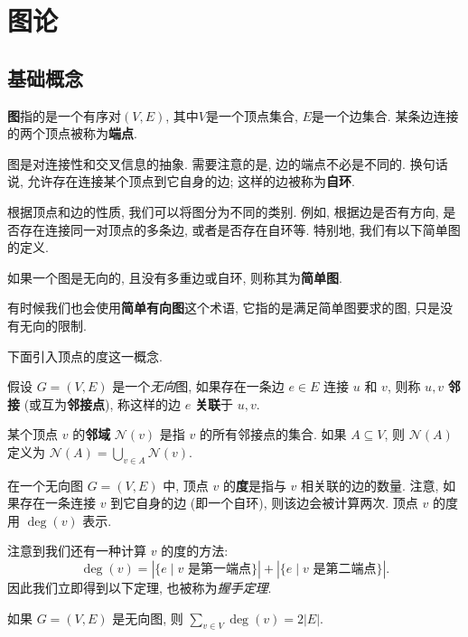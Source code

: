 \chapter{图论}
\section{基础概念}
\begin{definition}[图]
    \textbf{图}指的是一个有序对$(V, E)$, 其中$V$是一个顶点集合, $E$是一个边集合. 某条边连接的两个顶点被称为\textbf{端点}. 
\end{definition}

图是对连接性和交叉信息的抽象. 需要注意的是, 边的端点不必是不同的. 换句话说, 允许存在连接某个顶点到它自身的边; 这样的边被称为\textbf{自环}. 

根据顶点和边的性质, 我们可以将图分为不同的类别. 例如, 根据边是否有方向, 是否存在连接同一对顶点的多条边, 或者是否存在自环等. 特别地, 我们有以下简单图的定义. 

\begin{definition}[简单图]
    如果一个图是无向的, 且没有多重边或自环, 则称其为\textbf{简单图}.
\end{definition}

有时候我们也会使用\textbf{简单有向图}这个术语, 它指的是满足简单图要求的图, 只是没有无向的限制.

下面引入顶点的度这一概念.

\begin{definition}
    假设 $G=(V,E)$ 是一个\emph{无向}图, 如果存在一条边 $e\in E$ 连接 $u$ 和 $v$, 则称 $u,v$ \textbf{邻接} (或互为\textbf{邻接点}), 称这样的边 $e$ \textbf{关联}于 $u,v$.

    某个顶点 $v$ 的\textbf{邻域} $\mathcal{N}(v)$ 是指 $v$ 的所有邻接点的集合. 如果 $A\subseteq V$, 则 $\mathcal{N}(A)$ 定义为 $\displaystyle\mathcal{N}(A)=\bigcup_{v\in A}\mathcal{N}(v)$.
\end{definition}

\begin{definition}[度]
    在一个无向图 $G=(V,E)$ 中, 顶点 $v$ 的\textbf{度}是指与 $v$ 相关联的边的数量. 注意, 如果存在一条连接 $v$ 到它自身的边 (即一个自环), 则该边会被计算两次. 顶点 $v$ 的度用 $\deg(v)$ 表示.
\end{definition}

注意到我们还有一种计算 $v$ 的度的方法:
\[\deg(v)=|\{e\mid v\text{ 是第一端点}\}|+|\{e\mid v\text{ 是第二端点}\}|.\]
因此我们立即得到以下定理, 也被称为\emph{握手定理}.

\begin{theorem}
    如果 $G=(V,E)$ 是无向图, 则 $\displaystyle\sum_{v\in V}\deg(v)=2|E|$.
\end{theorem}


